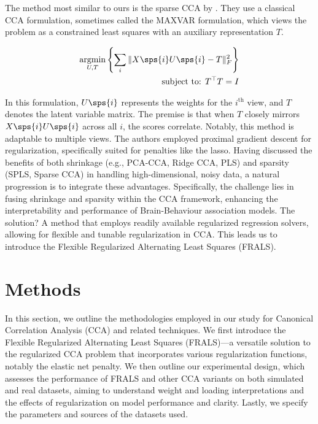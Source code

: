 The method most similar to ours is the sparse CCA by \cite{fu2017scalable}.
They use a classical CCA formulation, sometimes called the MAXVAR formulation, which views the problem as a constrained least squares with an auxiliary representation $T$\citep{carroll1968generalization,kettenring1971canonical}.


\begin{align}\label{eq:fu}
    \underset{U, T}{\mathrm{argmin}}\left\{\sum_i \|X\sps{i} U\sps{i} - T\|_F^2\right\}\\
    \text{subject to: }T^\top T = I\\
\end{align}

In this formulation, \(U\sps{i}\) represents the weights for the $i^{\text{th}}$ view, and \(T\) denotes the latent variable matrix.
The premise is that when \(T\) closely mirrors \(X\sps{i} U\sps{i}\) across all \(i\), the scores correlate.
Notably, this method is adaptable to multiple views.
The authors employed proximal gradient descent for regularization, specifically suited for penalties like the lasso.
Having discussed the benefits of both shrinkage (e.g., PCA-CCA, Ridge CCA, PLS) and sparsity (SPLS, Sparse CCA) in handling high-dimensional, noisy data, a natural progression is to integrate these advantages.
Specifically, the challenge lies in fusing shrinkage and sparsity within the CCA framework, enhancing the interpretability and performance of Brain-Behaviour association models.
The solution?
A method that employs readily available regularized regression solvers, allowing for flexible and tunable regularization in CCA.
This leads us to introduce the Flexible Regularized Alternating Least Squares (FRALS).

\section{Methods}

In this section, we outline the methodologies employed in our study for Canonical Correlation Analysis (CCA) and related techniques.
We first introduce the Flexible Regularized Alternating Least Squares (FRALS)—a versatile solution to the regularized CCA problem that incorporates various regularization functions, notably the elastic net penalty\cite{zou2005regularization}.
We then outline our experimental design, which assesses the performance of FRALS and other CCA variants on both simulated and real datasets, aiming to understand weight and loading interpretations and the effects of regularization on model performance and clarity.
Lastly, we specify the parameters and sources of the datasets used.

